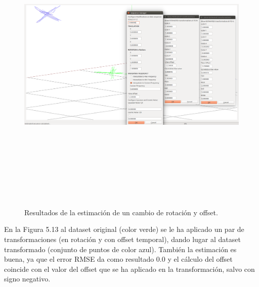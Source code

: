 \begin{figure}[H]
\begin{center}
\label{fig:opciones de View}\includegraphics[height=14.0cm,width=18.0cm]{img/cap6/Rota_Offset_abba.png}
\hspace{0.5cm}

\end{center}

\caption{Resultados de la estimación de un cambio de rotación y offset.}
\end{figure}

En la Figura 5.13 al dataset original (color verde) se le ha aplicado un par de transformaciones (en rotación y con offset temporal), dando lugar al dataset transformado (conjunto de puntos de color azul). También la estimación es buena, ya que el error RMSE da como resultado 0.0 y el cálculo del offset coincide con el valor del offset que se ha aplicado en la transformación, salvo con signo negativo.


